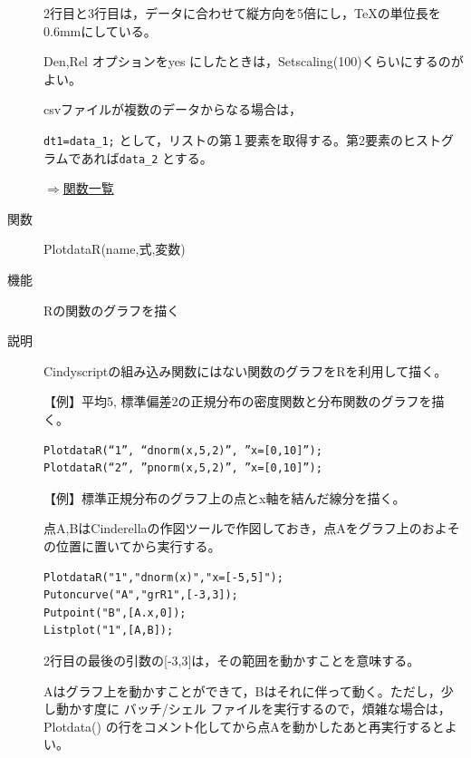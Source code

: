 \documentclass[papersize,a4paper,12pt,uplatex]{jsarticle}
\begin{document}
\begin{description}
2行目と3行目は，データに合わせて縦方向を5倍にし，TeXの単位長を0.6mmにしている。

Den,Rel オプションをyes にしたときは，Setscaling(100)くらいにするのがよい。

csvファイルが複数のデータからなる場合は，

\verb|dt1=data_1;|
として，リストの第１要素を取得する。第2要素のヒストグラムであれば\verb|data_2| とする。

\vspace{\baselineskip}
\begin{flushright}\hyperlink{functionlist}{$\Rightarrow$関数一覧}\end{flushright}

\hypertarget{plotdatar}{}
\item[関数]PlotdataR(name,式,変数)
\item[機能]Rの関数のグラフを描く
\item[説明]Cindyscriptの組み込み関数にはない関数のグラフをRを利用して描く。

\vspace{\baselineskip}
【例】平均5, 標準偏差2の正規分布の密度関数と分布関数のグラフを描く。
\begin{verbatim}
PlotdataR(“1”, “dnorm(x,5,2)”, ”x=[0,10]”);
PlotdataR(“2”, ”pnorm(x,5,2)”, ”x=[0,10]”);
\end{verbatim}

\hspace{20mm} 

【例】標準正規分布のグラフ上の点とx軸を結んだ線分を描く。

点A,BはCinderellaの作図ツールで作図しておき，点Aをグラフ上のおよその位置に置いてから実行する。
\begin{verbatim}
PlotdataR("1","dnorm(x)","x=[-5,5]");
Putoncurve("A","grR1",[-3,3]);
Putpoint("B",[A.x,0]);
Listplot("1",[A,B]);
\end{verbatim}
2行目の最後の引数の[-3,3]は，その範囲を動かすことを意味する。

Aはグラフ上を動かすことができて，Bはそれに伴って動く。ただし，少し動かす度に バッチ/シェル ファイルを実行するので，煩雑な場合は，Plotdata() の行をコメント化してから点Aを動かしたあと再実行するとよい。


\end{description}
\end{document}
